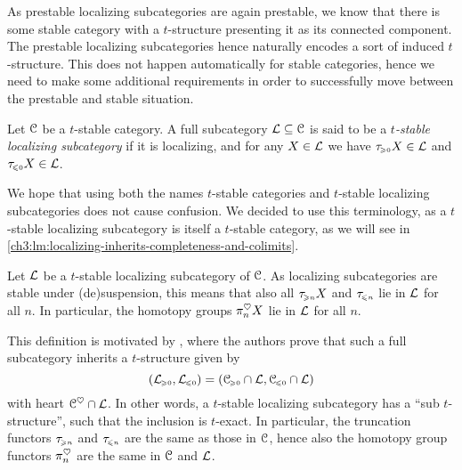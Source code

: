 As prestable localizing subcategories are again prestable, we know that there is some stable category with a $t$-structure presenting it as its connected component. The prestable localizing subcategories hence naturally encodes a sort of induced $t$-structure. This does not happen automatically for stable categories, hence we need to make some additional requirements in order to successfully move between the prestable and stable situation. 

\begin{definition}
    \label{ch3:def:t-stable-localizing-subcategory}
    Let $\EuScript{C}$ be a $t$-stable category. A full subcategory $\mathcal{L}\subseteq \EuScript{C}$ is said to be a \emph{$t$-stable localizing subcategory} if it is localizing, and for any $X\in \mathcal{L}$ we have $\tau_{\hspace{-1pt}\scriptscriptstyle\geqslant 0} X\in \mathcal{L}$ and $\tau_{\hspace{-1pt}\scriptscriptstyle\leqslant 0} X\in \mathcal{L}$. 
\end{definition}

\begin{remark}
    We hope that using both the names $t$-stable categories and $t$-stable localizing subcategories does not cause confusion. We decided to use this terminology, as a $t$-stable localizing subcategory is itself a $t$-stable category, as we will see in \cref{ch3:lm:localizing-inherits-completeness-and-colimits}. 
\end{remark}

\begin{remark}
    Let $\mathcal{L}$ be a $t$-stable localizing subcategory of $\EuScript{C}$. As localizing subcategories are stable under (de)suspension, this means that also all $\tau_{\hspace{-1pt}\scriptscriptstyle\geqslant n} X$ and $\tau_{\hspace{-1pt}\scriptscriptstyle\leqslant n}$ lie in $\mathcal{L}$ for all $n$. In particular, the homotopy groups $\pi_n^\heartsuit X$ lie in $\mathcal{L}$ for all $n$. 
\end{remark}

\begin{remark}
    \label{ch3:rm:t-stable-truncation-homotopy-the-same-functors}
    This definition is motivated by \cite[1.3.19]{beilinson-bernstein-deligne_1983}, where the authors prove that such a full subcategory inherits a $t$-structure given by 
    \[(\mathcal{L}_{\hspace{-1pt}\scriptscriptstyle\geqslant 0}, \mathcal{L}_{\hspace{-1pt}\scriptscriptstyle\leqslant 0}) = (\EuScript{C}_{\hspace{-1pt}\scriptscriptstyle\geqslant 0}\cap \mathcal{L}, \EuScript{C}_{\hspace{-1pt}\scriptscriptstyle\leqslant 0}\cap \mathcal{L})\]
    with heart $\EuScript{C}^\heartsuit\cap \mathcal{L}$. In other words, a $t$-stable localizing subcategory has a ``sub $t$-structure'', such that the inclusion is $t$-exact. In particular, the truncation functors $\tau_{\hspace{-1pt}\scriptscriptstyle\geqslant n}$ and $\tau_{\hspace{-1pt}\scriptscriptstyle\leqslant n}$ are the same as those in $\EuScript{C}$, hence also the homotopy group functors $\pi_n^\heartsuit$ are the same in $\EuScript{C}$ and $\mathcal{L}$. 
\end{remark}

